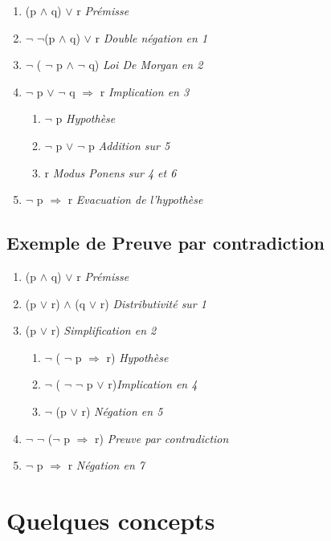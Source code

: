 \begin{enumerate}
\item (p $\land$ q) $\lor$ r  \it{Prémisse}
\item $\lnot$ $\lnot$(p $\land$ q) $\lor$ r \it{Double négation en 1}
\item $\lnot$ ( $\lnot$ p $\land$ $\lnot$ q) \it{Loi De Morgan en 2}
\item $\lnot$ p $\lor$ $\lnot$ q $\Rightarrow$ r \it{Implication en 3}

\begin{enumerate}
 \item  $\lnot$ p \it{Hypothèse}
 \item  $\lnot$ p $\lor$ $\lnot$ p \it{ Addition sur 5}
 \item  r \it{ Modus Ponens sur 4 et 6}
\end{enumerate}

\item  $\lnot$ p $\Rightarrow$ r \it{Evacuation de l'hypothèse}
\end{enumerate}

\subsection{Exemple de Preuve par contradiction}

\begin{enumerate}
\item  (p $\land$ q) $\lor$ r  \it{Prémisse}
\item  (p  $\lor$ r) $\land$ (q $\lor$ r) \it{Distributivité sur 1}
\item  (p $\lor$ r)  \it{Simplification en 2}

\begin{enumerate}
 \item $\lnot$ ( $\lnot$ p $\Rightarrow$ r)  \it{Hypothèse}
 \item $\lnot$ ( $\lnot$ $\lnot$ p $\lor$ r)\it{Implication en 4}
 \item $\lnot$ (p $\lor$ r) \it{ Négation en 5}
\end{enumerate}

\item $\lnot$ $\lnot$ ($\lnot$ p $\Rightarrow$ r)  \it{ Preuve par contradiction}
\item $\lnot$ p $\Rightarrow$ r \it{Négation en 7}
\end{enumerate}


\section{Quelques concepts}
